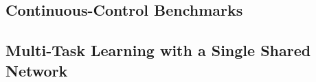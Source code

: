 \documentclass[12pt]{article}
\begin{document}
\subsection{Continuous-Control Benchmarks}







\subsection{Multi-Task Learning with a Single Shared Network}
\end{document}
